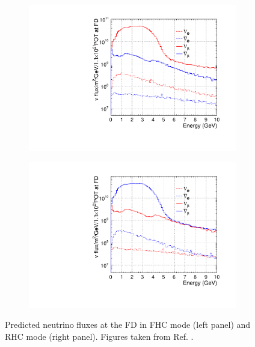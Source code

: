 \begin{figure}[h!]
	\begin{subfigure}{0.49\textwidth}
		\centering
		\includegraphics[width=.99\linewidth]{Images/DUNE/LBNF/dune_neutrino_fd_log}
	\end{subfigure}
	\begin{subfigure}{0.49\textwidth}
		\centering
		\includegraphics[width=.99\linewidth]{Images/DUNE/LBNF/dune_antineutrino_fd_log}
	\end{subfigure}
	\caption[Predicted neutrino fluxes at the FD in FHC mode and RHC mode.]{Predicted neutrino fluxes at the FD in FHC mode (left panel) and RHC mode (right panel). Figures taken from Ref. \cite{DUNE2020TDR2}.}
	\label{fig:dune_fd_flux}
\end{figure}